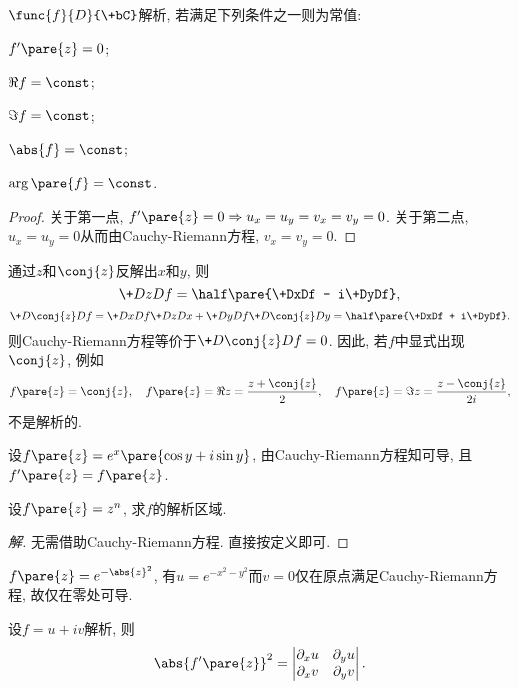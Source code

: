 \documentclass{ctexart}
\begin{document}
\begin{sample}
    \begin{ex}
        $\func{f}{D}{\+bC}$解析, 若满足下列条件之一则为常值:
        \begin{cenum}
            \item $f'\pare{z} = 0$;
            \item $\Re f = \const$;
            \item $\Im f = \const$;
            \item $\abs{f} = \const$;
            \item $\arg\pare{f} = \const$.
        \end{cenum}
    \end{ex}
    \begin{proof}
        关于第一点, $f'\pare{z} = 0\Rightarrow u_x=u_y=v_x=v_y = 0$. 关于第二点, $u_x=u_y=0$从而由Cauchy-Riemann方程, $v_x=v_y=0$. 
    \end{proof}
\end{sample}
\begin{remark}
    通过$z$和$\conj{z}$反解出$x$和$y$, 则
    \[ \+DzDf = \half\pare{\+DxDf - i\+DyDf}, \]
    \[ \+D{\conj{z}}Df = \+DxDf\+DzDx + \+DyDf \+D{\conj{z}}Dy = \half\pare{\+DxDf + i\+DyDf}. \]
    则Cauchy-Riemann方程等价于$\displaystyle\+D{\conj{z}}Df = 0$. 因此, 若$f$中显式出现$\conj{z}$, 例如
    \[ f\pare{z} = \conj{z},\quad f\pare{z} = \Re z = \frac{z+\conj{z}}{2}, \quad f\pare{z} = \Im z = \frac{z - \conj{z}}{2i}, \]
    不是解析的.
\end{remark}
\begin{sample}
    \begin{ex}
        设$f\pare{z} = e^x\pare{\cos y + i\sin y}$, 由Cauchy-Riemann方程知可导, 且$f'\pare{z} = f\pare{z}$.
    \end{ex}
    \begin{ex}
        设$f\pare{z} = z^n$, 求$f$的解析区域.
    \end{ex}
    \begin{proof}[解]
        无需借助Cauchy-Riemann方程. 直接按定义即可.
    \end{proof}
    \begin{ex}
        $f\pare{z} = e^{-\abs{z}^2}$, 有$u = e^{-x^2-y^2}$而$v=0$仅在原点满足Cauchy-Riemann方程, 故仅在零处可导.
    \end{ex}
    \begin{ex}
        设$f = u+iv$解析, 则
        \[ \abs{f'\pare{z}}^2 = \begin{vmatrix}
            \partial_x u & \partial_y u \\
            \partial_x v & \partial_y v
        \end{vmatrix}. \]
    \end{ex}
\end{sample}
\end{document}

